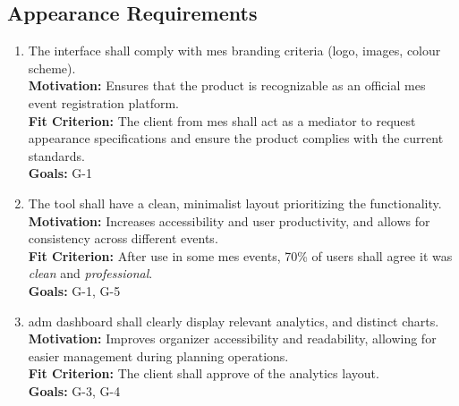 \documentclass[12pt]{article}
\begin{document}
\subsection{Appearance Requirements}
\begin{enumerate}[label=\bfseries AR-\arabic*:, wide=0pt, leftmargin=*, 
  ref=\bfseries AR-\arabic*]
  \item \label{AR1} The interface shall comply with \Gls{mes} branding criteria (logo, images, colour scheme).\\[2mm]
    {\bf Motivation:} Ensures that the product is recognizable as an official \Gls{mes} event registration platform.\\
    {\bf Fit Criterion:} The client from \Gls{mes} shall act as a mediator to request appearance specifications and ensure the product complies with the current standards.\\
    {\bf Goals:} G-1
  \item \label{AR2} The tool shall have a clean, minimalist layout prioritizing the functionality.\\[2mm]
    {\bf Motivation:} Increases accessibility and user productivity, and allows for consistency across different events.\\
    {\bf Fit Criterion:} After use in some \Gls{mes} events, 70\% of users shall agree it was \textit{clean} and \textit{professional}.\\
    {\bf Goals:} G-1, G-5
  \item \label{AR3} \Gls{adm} dashboard shall clearly display relevant analytics, and distinct charts.\\[2mm]
    {\bf Motivation:} Improves organizer accessibility and readability, allowing for easier management during planning operations.\\
    {\bf Fit Criterion:} The client shall approve of the analytics layout.\\
    {\bf Goals:} G-3, G-4
\end{enumerate}
\end{document}

